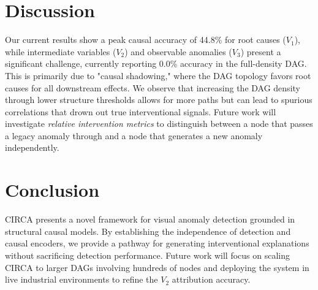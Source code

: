 \documentclass{article}
\begin{document}
\section{Discussion}
Our current results show a peak causal accuracy of 44.8\% for root causes ($V_1$), while intermediate variables ($V_2$) and observable anomalies ($V_3$) present a significant challenge, currently reporting 0.0\% accuracy in the full-density DAG. This is primarily due to "causal shadowing," where the DAG topology favors root causes for all downstream effects. We observe that increasing the DAG density through lower structure thresholds allows for more paths but can lead to spurious correlations that drown out true interventional signals. Future work will investigate \emph{relative intervention metrics} to distinguish between a node that passes a legacy anomaly through and a node that generates a new anomaly independently.

\section{Conclusion}
CIRCA presents a novel framework for visual anomaly detection grounded in structural causal models. By establishing the independence of detection and causal encoders, we provide a pathway for generating interventional explanations without sacrificing detection performance. Future work will focus on scaling CIRCA to larger DAGs involving hundreds of nodes and deploying the system in live industrial environments to refine the $V_2$ attribution accuracy.
\end{document}
